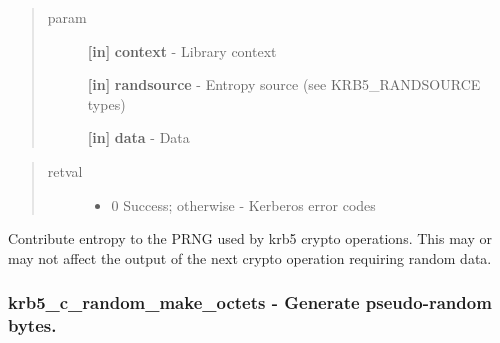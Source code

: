 \documentclass[letterpaper,10pt,english]{sphinxmanual}
\begin{document}
\begin{quote}\begin{description}
\item[{param}] \leavevmode
\textbf{{[}in{]}} \textbf{context} - Library context

\textbf{{[}in{]}} \textbf{randsource} - Entropy source (see KRB5\_RANDSOURCE types)

\textbf{{[}in{]}} \textbf{data} - Data

\end{description}\end{quote}
\begin{quote}\begin{description}
\item[{retval}] \leavevmode\begin{itemize}
\item {} 
0   Success; otherwise - Kerberos error codes

\end{itemize}

\end{description}\end{quote}

Contribute entropy to the PRNG used by krb5 crypto operations. This may or may not affect the output of the next crypto operation requiring random data.


\subsubsection{krb5\_c\_random\_make\_octets -  Generate pseudo-random bytes.}
\label{appdev/refs/api/krb5_c_random_make_octets::doc}\label{appdev/refs/api/krb5_c_random_make_octets:krb5-c-random-make-octets-generate-pseudo-random-bytes}

\begin{fulllineitems}
\label{appdev/refs/api/krb5_c_random_make_octets:c.krb5_c_random_make_octets}
\end{fulllineitems}
\end{document}

